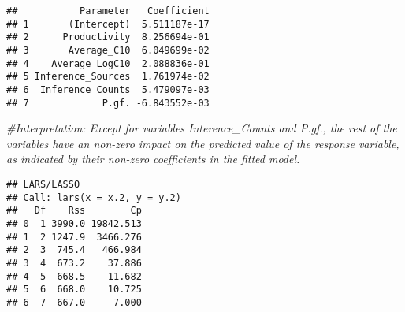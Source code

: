 \documentclass[
]{article}
\newenvironment{Shaded}{\begin{snugshade}}{\end{snugshade}}
\newcommand{\AttributeTok}[1]{\textcolor[rgb]{0.13,0.29,0.53}{#1}}
\newcommand{\CommentTok}[1]{\textcolor[rgb]{0.56,0.35,0.01}{\textit{#1}}}
\newcommand{\DecValTok}[1]{\textcolor[rgb]{0.00,0.00,0.81}{#1}}
\newcommand{\FloatTok}[1]{\textcolor[rgb]{0.00,0.00,0.81}{#1}}
\newcommand{\FunctionTok}[1]{\textcolor[rgb]{0.13,0.29,0.53}{\textbf{#1}}}
\newcommand{\NormalTok}[1]{#1}
\newcommand{\OtherTok}[1]{\textcolor[rgb]{0.56,0.35,0.01}{#1}}
\newcommand{\SpecialCharTok}[1]{\textcolor[rgb]{0.81,0.36,0.00}{\textbf{#1}}}
\newcommand{\StringTok}[1]{\textcolor[rgb]{0.31,0.60,0.02}{#1}}
\begin{document}
\begin{verbatim}
##           Parameter   Coefficient
## 1       (Intercept)  5.511187e-17
## 2      Productivity  8.256694e-01
## 3       Average_C10  6.049699e-02
## 4    Average_LogC10  2.088836e-01
## 5 Inference_Sources  1.761974e-02
## 6  Inference_Counts  5.479097e-03
## 7             P.gf. -6.843552e-03
\end{verbatim}

\begin{Shaded}
\begin{Highlighting}[]
\CommentTok{\#Interpretation: Except for variables Interence\_Counts and P.gf., the rest of the variables have an non{-}zero impact on the predicted value of the response variable, as indicated by their non{-}zero coefficients in the fitted model.}
\end{Highlighting}
\end{Shaded}

\begin{Shaded}
\end{Shaded}

\begin{verbatim}
## LARS/LASSO
## Call: lars(x = x.2, y = y.2)
##   Df    Rss        Cp
## 0  1 3990.0 19842.513
## 1  2 1247.9  3466.276
## 2  3  745.4   466.984
## 3  4  673.2    37.886
## 4  5  668.5    11.682
## 5  6  668.0    10.725
## 6  7  667.0     7.000
\end{verbatim}

\begin{Shaded}
\end{Shaded}
\end{document}
